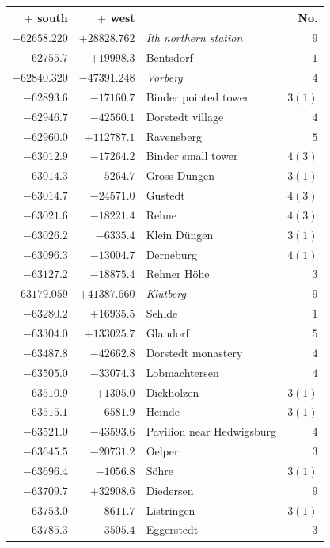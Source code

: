 \clearpage{}%
\begin{center}\begingroup\fontsize{8}{9}\selectfont
\setlength{\tabcolsep}{4pt}
\begin{tabular}{r|r|p{170pt}|r}\hline
\(+\) south&\(+\) west&&No.\\\hline
\(-62658.220\)&\(+28828.762\)&\textit{Ith northern station}&\(9\)\\
\(-62755.7\)&\(+19998.3\)&Bentsdorf&\(1\)\\
\(-62840.320\)&\(-47391.248\)&\textit{Vorberg}&\(4\)\\
\(-62893.6\)&\(-17160.7\)&Binder pointed tower&\(3 (1)\)\\
\(-62946.7\)&\(-42560.1\)&Dorstedt village&\(4\)\\
\(-62960.0\)&\(+112787.1\)&Ravensberg&\(5\)\\
\(-63012.9\)&\(-17264.2\)&Binder small tower&\(4 (3)\)\\
\(-63014.3\)&\(-5264.7\)&Gross Dungen&\(3 (1)\)\\
\(-63014.7\)&\(-24571.0\)&Gustedt&\(4 (3)\)\\
\(-63021.6\)&\(-18221.4\)&Rehne&\(4 (3)\)\\
\(-63026.2\)&\(-6335.4\)&Klein Düngen&\(3 (1)\)\\
\(-63096.3\)&\(-13004.7\)&Derneburg&\(4 (1)\)\\
\(-63127.2\)&\(-18875.4\)&Rehner Höhe&\(3\)\\
\(-63179.059\)&\(+41387.660\)&\textit{Klütberg}&\(9\)\\
\(-63280.2\)&\(+16935.5\)&Sehlde&\(1\)\\
\(-63304.0\)&\(+133025.7\)&Glandorf&\(5\)\\
\(-63487.8\)&\(-42662.8\)&Dorstedt monastery&\(4\)\\
\(-63505.0\)&\(-33074.3\)&Lobmachtersen&\(4\)\\
\(-63510.9\)&\(+1305.0\)&Dickholzen&\(3 (1)\)\\
\(-63515.1\)&\(-6581.9\)&Heinde&\(3 (1)\)\\
\(-63521.0\)&\(-43593.6\)&Pavilion near Hedwigsburg&\(4\)\\
\(-63645.5\)&\(-20731.2\)&Oelper&\(3\)\\
\(-63696.4\)&\(-1056.8\)&Söhre&\(3 (1)\)\\
\(-63709.7\)&\(+32908.6\)&Diedersen&\(9\)\\
\(-63753.0\)&\(-8611.7\)&Listringen&\(3 (1)\)\\
\(-63785.3\)&\(-3505.4\)&Eggerstedt&\(3\)\\

\end{tabular}
\end{center}
